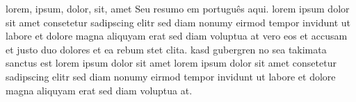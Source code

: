 \documentclass[english]{pucrs-ppgcc}
\author{{Darlan Alves Jurak}}
\title{\writeTitleHerePT}
      {\writeTitleHere}
\begin{document}




\begin{resumo}{lorem, ipsum, dolor, sit, amet}
Seu resumo em português aqui. lorem ipsum dolor sit amet consetetur sadipscing elitr sed diam nonumy eirmod tempor invidunt ut labore et dolore magna aliquyam erat sed diam voluptua at vero eos et accusam et justo duo dolores et ea rebum stet clita.  kasd gubergren no sea takimata sanctus est lorem ipsum dolor sit amet lorem ipsum dolor sit amet consetetur sadipscing elitr sed diam nonumy eirmod tempor invidunt ut labore et dolore magna aliquyam erat sed diam voluptua at.
\end{resumo}

\begin{abstract}{lorem, ipsum, dolor, sit, amet}
Your abstract in English here. lorem ipsum dolor sit amet consetetur sadipscing elitr sed diam nonumy eirmod tempor invidunt ut labore et dolore magna aliquyam erat sed diam voluptua at vero eos et accusam et justo duo dolores et ea rebum stet clita kasd gubergren no sea takimata sanctus est lorem ipsum dolor sit amet lorem ipsum dolor sit amet consetetur sadipscing elitr sed diam nonumy eirmod tempor invidunt ut labore et dolore magna aliquyam erat sed diam voluptua at
\end{abstract}
\end{document}
